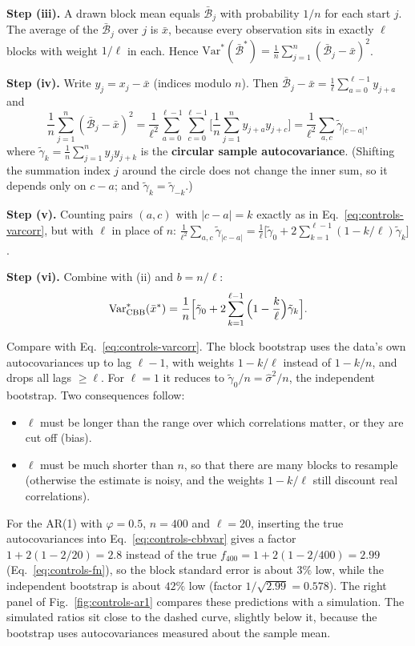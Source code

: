 \textbf{Step (iii).} A drawn block mean equals $\bar{\mathcal B}_j$ with probability $1/n$ for each start $j$. The average of the $\bar{\mathcal B}_j$ over $j$ is $\bar x$, because every observation sits in exactly $\ell$ blocks with weight $1/\ell$ in each. Hence $\mathrm{Var}^*(\bar{\mathcal B}^*)=\frac1n\sum_{j=1}^n(\bar{\mathcal B}_j-\bar x)^2$.

\textbf{Step (iv).} Write $y_j=x_j-\bar x$ (indices modulo $n$). Then $\bar{\mathcal B}_j-\bar x=\frac1\ell\sum_{a=0}^{\ell-1}y_{j+a}$ and
\begin{equation}
\frac1n\sum_{j=1}^n(\bar{\mathcal B}_j-\bar x)^2=\frac1{\ell^2}\sum_{a=0}^{\ell-1}\sum_{c=0}^{\ell-1}\Big[\frac1n\sum_{j=1}^ny_{j+a}y_{j+c}\Big]=\frac1{\ell^2}\sum_{a,c}\tilde\gamma_{|c-a|},
\end{equation}
where $\tilde\gamma_k=\frac1n\sum_{j=1}^ny_jy_{j+k}$ is the \textbf{circular sample autocovariance}. (Shifting the summation index $j$ around the circle does not change the inner sum, so it depends only on $c-a$; and $\tilde\gamma_k=\tilde\gamma_{-k}$.)

\textbf{Step (v).} Counting pairs $(a,c)$ with $|c-a|=k$ exactly as in Eq.~\eqref{eq:controls-varcorr}, but with $\ell$ in place of $n$:
$\frac1{\ell^2}\sum_{a,c}\tilde\gamma_{|c-a|}=\frac1\ell\big[\tilde\gamma_0+2\sum_{k=1}^{\ell-1}(1-k/\ell)\tilde\gamma_k\big]$.

\textbf{Step (vi).} Combine with (ii) and $b=n/\ell$:
\begin{equation}
\mathrm{Var}^*_{\rm CBB}(\bar x^*)=\frac1n\Big[\tilde\gamma_0+2\sum_{k=1}^{\ell-1}\Big(1-\frac k\ell\Big)\tilde\gamma_k\Big].
\label{eq:controls-cbbvar}
\end{equation}

Compare with Eq.~\eqref{eq:controls-varcorr}. The block bootstrap uses the data's own autocovariances up to lag $\ell-1$, with weights $1-k/\ell$ instead of $1-k/n$, and drops all lags $\ge\ell$. For $\ell=1$ it reduces to $\tilde\gamma_0/n=\hat\sigma^2/n$, the independent bootstrap. Two consequences follow:
\begin{itemize}
\item $\ell$ must be longer than the range over which correlations matter, or they are cut off (bias).
\item $\ell$ must be much shorter than $n$, so that there are many blocks to resample (otherwise the estimate is noisy, and the weights $1-k/\ell$ still discount real correlations).
\end{itemize}
For the AR(1) with $\varphi=0.5$, $n=400$ and $\ell=20$, inserting the true autocovariances into Eq.~\eqref{eq:controls-cbbvar} gives a factor $1+2(1-2/20)=2.8$ instead of the true $f_{400}=1+2(1-2/400)=2.99$ (Eq.~\eqref{eq:controls-fn}), so the block standard error is about $3\%$ low, while the independent bootstrap is about $42\%$ low (factor $1/\sqrt{2.99}=0.578$). The right panel of Fig.~\ref{fig:controls-ar1} compares these predictions with a simulation. The simulated ratios sit close to the dashed curve, slightly below it, because the bootstrap uses autocovariances measured about the sample mean.

